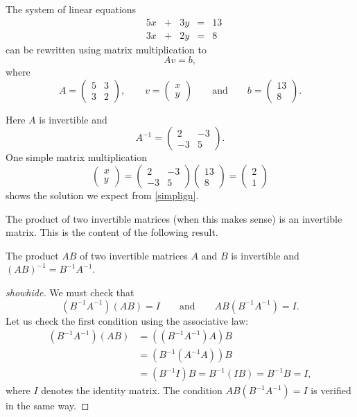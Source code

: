\documentclass{article}
\begin{document}
\begin{example}
  The system of linear equations
\begin{equation}\label{simplign}
\begin{matrix}
&5 x &+ &3 y &= &13\\
&3 x &+&2 y &= &8
\end{matrix}
\end{equation}
can be rewritten using matrix multiplication to
$$
A v = b,
$$
where
$$
A = \begin{pmatrix}
5& 3 \\ 
3 & 2
\end{pmatrix}, \qquad
v = 
\begin{pmatrix} x \\ y \end{pmatrix}\qquad \text{and}\qquad
b = \begin{pmatrix} 13 \\ 8 \end{pmatrix}.
$$ 

Here $A$ is invertible and
$$
A^{-1} = 
\begin{pmatrix}
2 & -3\\
-3 & 5
\end{pmatrix}.
$$
One simple matrix multiplication
$$
\begin{pmatrix} x \\ y \end{pmatrix} = 
\begin{pmatrix}
2 & -3\\
-3 & 5
\end{pmatrix} \begin{pmatrix} 13 \\ 8 \end{pmatrix} = 
\begin{pmatrix} 2 \\ 1 \end{pmatrix}
$$
shows the solution we expect from  \eqref{simplign}.
\end{example}


The product of two invertible matrices (when this makes sense)
is an invertible matrix. This is the content of the following result.

\label{prodinv}
\begin{proposition}
The product $A B$ of  two invertible matrices $A$ and $B$ is invertible and
$(A B)^{-1} = B^{-1} A^{-1}$.
\end{proposition}
\begin{proof}[showhide]
We must check that 
$$
(B^{-1} A^{-1}) (A B) = I\qquad\text{and}\qquad A B (B^{-1} A^{-1}) = I.
$$
Let us check the first condition using the associative law:
\begin{align*}
(B^{-1} A^{-1}) (A B) &= ((B^{-1} A^{-1}) A) B\\
                    &= (B^{-1} (A^{-1} A)) B \\
                    &= (B^{-1} I) B = B^{-1} (I B) = B^{-1} B = I,
\end{align*}
where  $I$ denotes the identity matrix. The condition $A B (B^{-1} A^{-1}) = I$ is verified in the
same way.
\end{proof}
\end{document}
